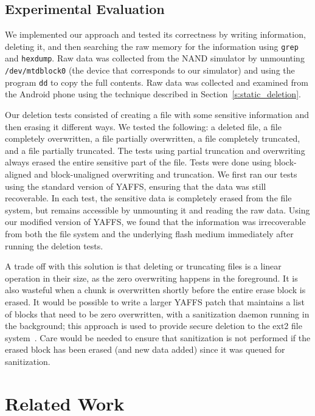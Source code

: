 \documentclass{acmtog}
\begin{document}
\subsection{Experimental Evaluation}

We implemented  our  approach and tested its correctness by writing information,
deleting it, and then searching the raw memory for the information using
 \texttt{grep} and \texttt{hexdump}. Raw data was collected from the NAND simulator by unmounting
\texttt{/dev/mtdblock0} (the device that corresponds to our simulator) and
using the program \texttt{dd} to copy the full contents. 
Raw data was collected and examined from the Android phone using the 
technique described in Section~\ref{s:static_deletion}.

Our deletion tests consisted of creating a file with some sensitive
information and then erasing it  different ways. We tested the following: a deleted file, a file
completely overwritten, a file partially overwritten, a file
completely truncated, and a file partially truncated. The tests using partial
truncation and overwriting always erased the entire sensitive part of the file. Tests were done using
block-aligned and block-unaligned overwriting and truncation. 
We first ran our tests using the standard version of YAFFS, ensuring that the
data was still recoverable. In each test, the sensitive data is completely
erased from the file system, but remains accessible by unmounting it and
reading the raw data.  Using our modified version of YAFFS, we found that the
information was irrecoverable from both the file system and the underlying
flash medium immediately after running the deletion tests. 

A trade off with this solution is that deleting or truncating files is a linear
operation in their size, as the zero overwriting happens in the foreground. It is
also wasteful when a chunk is overwritten shortly before the entire erase
block is erased. It would be
possible to write a larger YAFFS patch that maintains a list of blocks
that need to be zero overwritten, with a sanitization daemon running in the
background; this approach is used to provide secure deletion to the ext2 file
system~\cite{ext2secdel}. Care would be needed to ensure that sanitization is
not performed if the erased block has been erased (and new data added) since
it was queued for sanitization.

\section{Related Work}
\end{document}
